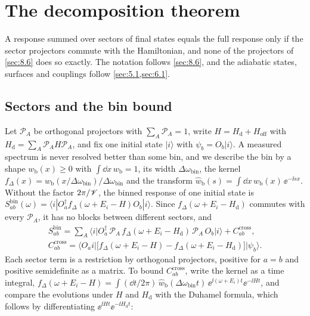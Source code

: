 \section{The decomposition theorem}\label{app:D.28}

A response summed over sectors of final states equals the full response only if the sector projectors commute with the Hamiltonian, and none of the projectors of \cref{sec:8.6} does so exactly. The notation follows \cref{sec:8.6}, and the adiabatic states, surfaces and couplings follow \cref{sec:5.1,sec:6.1}.

\subsection{Sectors and the bin bound}

Let $\mathcal{P}_A$ be orthogonal projectors with $\sum_A\mathcal{P}_A = 1$, write $H = H_{\mathrm{d}} + H_{\mathrm{off}}$ with $H_{\mathrm{d}} = \sum_A\mathcal{P}_AH\mathcal{P}_A$, and fix one initial state $|i\rangle$ with $\psi_b = O_b|i\rangle$. A measured spectrum is never resolved better than some bin, and we describe the bin by a shape $w_{\mathrm{b}}(x) \ge 0$ with $\int\dd x\,w_{\mathrm{b}} = 1$, its width $\Delta\omega_{\mathrm{bin}}$, the kernel $f_\Delta(x) = w_{\mathrm{b}}(x/\Delta\omega_{\mathrm{bin}})/\Delta\omega_{\mathrm{bin}}$ and the transform $\hat w_{\mathrm{b}}(s) = \int\dd x\,w_{\mathrm{b}}(x)\,\ee^{-\ii sx}$. Without the factor $2\pi/\mathscr{V}$, the binned response of one initial state is $S^{\mathrm{bin}}_{ab}(\omega) = \langle i|O_a^\dagger f_\Delta(\omega + E_i - H)O_b|i\rangle$. Since $f_\Delta(\omega + E_i - H_{\mathrm{d}})$ commutes with every $\mathcal{P}_A$, it has no blocks between different sectors, and
\begin{gather*}
  S^{\mathrm{bin}}_{ab} = \sum_A\bigl\langle i\big|O_a^\dagger\,\mathcal{P}_A\,f_\Delta(\omega + E_i - H_{\mathrm{d}})\,\mathcal{P}_A\,O_b\big|i\bigr\rangle + C^{\mathrm{cross}}_{ab} , \\
  C^{\mathrm{cross}}_{ab} = \bigl\langle O_ai\big|\bigl[f_\Delta(\omega + E_i - H) - f_\Delta(\omega + E_i - H_{\mathrm{d}})\bigr]\big|\psi_b\bigr\rangle .
\end{gather*}
Each sector term is a restriction by orthogonal projectors, positive for $a = b$ and positive semidefinite as a matrix. To bound $C^{\mathrm{cross}}_{ab}$, write the kernel as a time integral, $f_\Delta(\omega + E_i - H) = \int(\dd t/2\pi)\,\hat w_{\mathrm{b}}(\Delta\omega_{\mathrm{bin}}t)\,\ee^{\ii(\omega + E_i)t}\ee^{-\ii Ht}$, and compare the evolutions under $H$ and $H_{\mathrm{d}}$ with the Duhamel formula, which follows by differentiating $\ee^{\ii Ht}\ee^{-\ii H_{\mathrm{d}}t}$:
